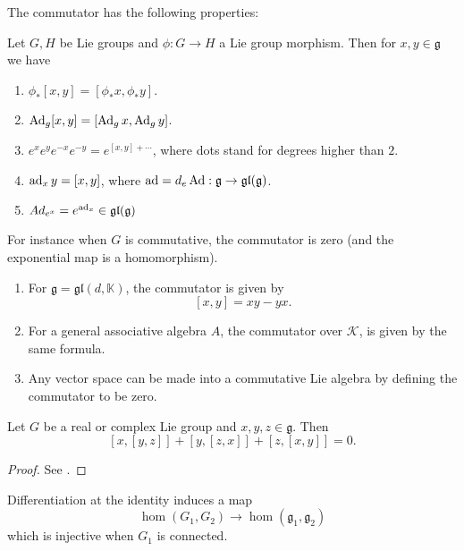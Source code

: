 \documentclass{report}
\begin{document}
The commutator has the following properties:
\begin{proposition}
    Let $G, H$ be Lie groups and $\phi: G \to H$ a Lie group morphism.
    Then for $x,y \in \mathfrak g$ we have
    \begin{enumerate}[label = (\roman*)]
        \item $\phi_{*} [x,y] = [\phi_{*} x, \phi_{*} y]$.
        \item $\operatorname{Ad}_g[x,y] = [\operatorname{Ad}_g x, \operatorname{Ad}_g y]$.
        \item $e^x e^y e^{-x} e^{-y} = e^{[x,y]+\cdots}$, where dots stand for degrees higher than $2$.
        \item $\operatorname{ad}_x y = [x,y]$, where $\operatorname{ad} = d_e \operatorname{Ad}: \mathfrak g \to \mathfrak{gl}(\mathfrak g)$.
        \item $Ad_{e^x} = e^{\operatorname{ad}_x} \in \mathfrak{gl}(\mathfrak g)$
    \end{enumerate}
\end{proposition}
For instance when $G$ is commutative, the commutator is zero (and the exponential map is a homomorphism).
\begin{example}
    \begin{enumerate}[label = (\roman*)]
        \item For $\mathfrak g = \mathfrak{gl}(d, \mathbb K)$, the commutator is given by
        \[
        [x,y] = xy - yx.
        \]
        \item For a general associative algebra $A$, the commutator over $\mathcal K$, is given by the same formula.
        \item Any vector space can be made into a commutative Lie algebra by defining the commutator to be zero.
    \end{enumerate}
\end{example}

\begin{theorem}
    Let $G$ be a real or complex Lie group and $x,y,z \in \mathfrak g$.
    Then
    \[
    [x,[y,z]] + [y,[z,x]] + [z,[x,y]] = 0.
    \]
\end{theorem}
\begin{proof}
    See \cite[Theorem 3.16]{kirillov2008introduction}.
\end{proof}
\begin{proposition}
    Differentiation at the identity induces a map
    \[
    \hom(G_1, G_2) \to \hom(\mathfrak g_1, \mathfrak g_2)
    \]
    which is injective when $G_1$ is connected.
\end{proposition}
\end{document}
